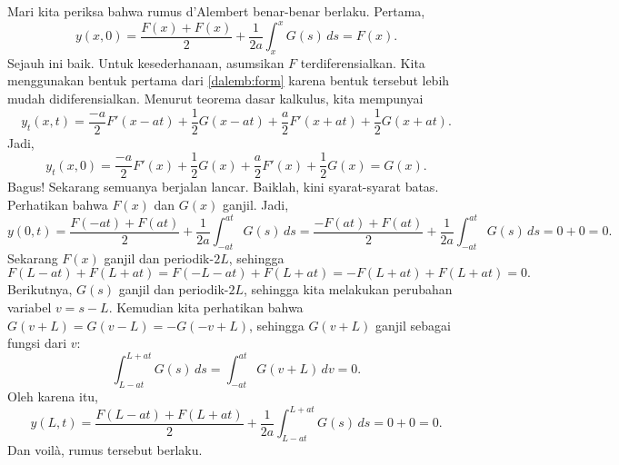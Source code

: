 Mari kita periksa bahwa rumus d'Alembert benar-benar berlaku.
Pertama,
\begin{equation*}
y(x,0) =
\frac{F(x) + F(x)}{2} + \frac{1}{2a} \int_{x}^{x} G(s) \,ds 
=
F(x) .
\end{equation*}
Sejauh ini baik.  Untuk kesederhanaan, asumsikan $F$ terdiferensialkan.
Kita menggunakan bentuk pertama dari \eqref{dalemb:form} karena bentuk tersebut
lebih mudah didiferensialkan.
Menurut teorema dasar kalkulus, kita mempunyai
\begin{equation*}
y_t(x,t) =
\frac{-a}{2} F'(x-at) + \frac{1}{2} G(x-at)
+
\frac{a}{2} F'(x+at) + \frac{1}{2} G(x+at) .
\end{equation*}
Jadi,
\begin{equation*}
y_t(x,0) =
\frac{-a}{2} F'(x) + \frac{1}{2} G(x)
+
\frac{a}{2} F'(x) + \frac{1}{2} G(x) = G(x) .
\end{equation*}
Bagus!  Sekarang semuanya berjalan lancar.  Baiklah, kini syarat-syarat batas.  Perhatikan
bahwa $F(x)$ dan $G(x)$ ganjil.  Jadi,
\begin{equation*}
y(0,t)
=
\frac{F(-at) + F(at)}{2} + \frac{1}{2a} \int_{-at}^{at} G(s) \,ds 
=
\frac{-F(at) + F(at)}{2} + \frac{1}{2a} \int_{-at}^{at} G(s) \,ds 
= 0 + 0 = 0.
\end{equation*}
Sekarang $F(x)$ ganjil dan periodik-$2L$, sehingga
\begin{equation*}
F(L-at)+F(L+at)
= 
F(-L-at)+F(L+at)
=
-F(L+at)+F(L+at)
= 0 .
\end{equation*}
Berikutnya, $G(s)$ ganjil dan periodik-$2L$, sehingga kita melakukan perubahan
variabel $v = s-L$.  Kemudian kita perhatikan bahwa $G(v+L)=G(v-L)=-G(-v+L)$,
sehingga $G(v+L)$ ganjil sebagai fungsi dari $v$:
\begin{equation*}
\int_{L-at}^{L+at}
G(s)\,ds
=
\int_{-at}^{at}
G(v+L)\,dv
=
0 .
\end{equation*}
Oleh karena itu,
\begin{equation*}
y(L,t) =
\frac{F(L-at) + F(L+at)}{2} + \frac{1}{2a} \int_{L-at}^{L+at} G(s) \,ds 
=
0 + 0  = 0.
\end{equation*}
Dan voil\`a, rumus tersebut berlaku.

